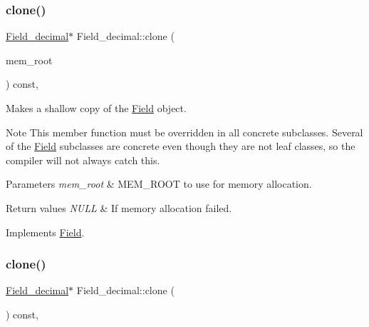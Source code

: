 \subsubsection{\texorpdfstring{clone()}{clone()}\hspace{0.1cm}{\footnotesize\ttfamily [1/2]}}
{\footnotesize\ttfamily \mbox{\hyperlink{classField__decimal}{Field\+\_\+decimal}}$\ast$ Field\+\_\+decimal\+::clone (\begin{DoxyParamCaption}\item[{M\+E\+M\+\_\+\+R\+O\+OT $\ast$}]{mem\+\_\+root }\end{DoxyParamCaption}) const\hspace{0.3cm}{\ttfamily [inline]}, {\ttfamily [virtual]}}

Makes a shallow copy of the \mbox{\hyperlink{classField}{Field}} object.

\begin{DoxyNote}{Note}
This member function must be overridden in all concrete subclasses. Several of the \mbox{\hyperlink{classField}{Field}} subclasses are concrete even though they are not leaf classes, so the compiler will not always catch this.
\end{DoxyNote}

\begin{DoxyParams}{Parameters}
{\em mem\+\_\+root} & M\+E\+M\+\_\+\+R\+O\+OT to use for memory allocation. \\
\hline
\end{DoxyParams}

\begin{DoxyRetVals}{Return values}
{\em N\+U\+LL} & If memory allocation failed. \\
\hline
\end{DoxyRetVals}


Implements \mbox{\hyperlink{classField_a64979bcb9345803b031fff76a0c3d9fe}{Field}}.

\mbox{\label{classField__decimal_abedb8750121b8822d71ae8b6d8226964}} 
\subsubsection{\texorpdfstring{clone()}{clone()}\hspace{0.1cm}{\footnotesize\ttfamily [2/2]}}
{\footnotesize\ttfamily \mbox{\hyperlink{classField__decimal}{Field\+\_\+decimal}}$\ast$ Field\+\_\+decimal\+::clone (\begin{DoxyParamCaption}{ }\end{DoxyParamCaption}) const\hspace{0.3cm}{\ttfamily [inline]}, {\ttfamily [virtual]}}

